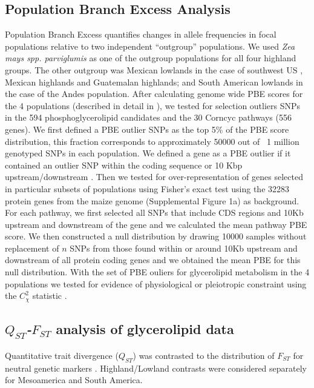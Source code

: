 \documentclass[9pt,twocolumn,twoside,lineno]{BioRxiv}
\begin{document}
\subsection{Population Branch Excess Analysis}
Population Branch Excess quantifies changes in allele frequencies in focal populations relative to two independent “outgroup” populations.
We used \textit{Zea mays spp. parviglumis} as one of the outgroup populations for all four highland groups.  
The other outgroup was  Mexican lowlands  in the case of southwest US , Mexican highlands and Guatemalan highlands; and South American lowlands in the case of the Andes population. 
After calculating genome wide PBE scores for the 4 populations (described in detail in \cite{Wang2020-mp}), we tested for selection outliers SNPs in the 594 phosphoglycerolipid candidates and the 30 Corncyc pathways (556 genes).
We first defined a PBE outlier SNPs as the top 5\% of the PBE score distribution, this fraction corresponds to approximately 50000 out of ~1 million genotyped SNPs in each population. 
We defined a gene as a PBE outlier if it contained an outlier SNP within the coding sequence or 10 Kbp upstream/downstream  \cite{Wang2020-mp}. 
Then we tested for over-representation of genes selected in particular subsets of populations using Fisher's exact test using the 32283 protein genes from the maize genome (Supplemental Figure 1a) \cite{wang2015a} as background. 
For each pathway, we first selected all SNPs that include CDS regions and 10Kb upstream and downstream of the gene and we calculated the mean pathway PBE score. 
We then constructed a null distribution by drawing 10000 samples without replacement of $n$ SNPs from those found within or around 10Kb upstream and downstream of all protein coding genes and we obtained the mean PBE for this null distribution. 
With the set of PBE ouliers for glycerolipid metabolism in the 4 populations we tested for evidence of physiological or pleiotropic constraint using the $C_\chi^2$ statistic \cite{yeaman2018}. 

\subsection{\textit{$Q_{ST}$-$F_{ST}$} analysis of glycerolipid data}
Quantitative trait divergence ($Q_{ST}$) was contrasted to the distribution of $F_{ST}$ for neutral genetic markers \cite{whitlock2008evolutionary}.
Highland/Lowland contrasts were considered separately for Mesoamerica and South America.
\end{document}
